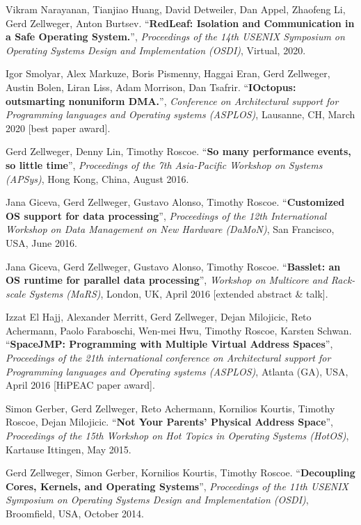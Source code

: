 \documentclass[margin,line]{cv/cv}
\begin{document}
\begin{resume}
    Vikram Narayanan, Tianjiao Huang, David Detweiler, Dan Appel, Zhaofeng Li, Gerd Zellweger, Anton Burtsev.
    ``\textbf{RedLeaf: Isolation and Communication in a Safe Operating System.}'', \textsl{Proceedings of the 14th USENIX Symposium on Operating Systems Design and Implementation (OSDI)}, Virtual, 2020.

    Igor Smolyar, Alex Markuze, Boris Pismenny, Haggai Eran, Gerd Zellweger, Austin Bolen, Liran Liss, Adam Morrison, Dan Tsafrir.
    ``\textbf{IOctopus: outsmarting nonuniform DMA.}'', \textsl{Conference on Architectural support for Programming languages and Operating systems (ASPLOS)}, Lausanne, CH, March 2020 [best paper award].

    Gerd Zellweger, Denny Lin, Timothy Roscoe.
    ``\textbf{So many performance events, so little time}'', \textsl{Proceedings of the 7th Asia-Pacific Workshop on Systems (APSys)}, Hong Kong, China, August 2016.

    Jana Giceva, Gerd Zellweger, Gustavo Alonso, Timothy Roscoe.
    ``\textbf{Customized OS support for data processing}'',
    \textsl{Proceedings of the 12th International Workshop on Data Management on New Hardware (DaMoN)}, San Francisco, USA, June 2016.

    Jana Giceva, Gerd Zellweger, Gustavo Alonso, Timothy Roscoe.
    ``\textbf{Basslet: an OS runtime for parallel data processing}'',
    \textsl{Workshop on Multicore and Rack-scale Systems (MaRS)}, London, UK, April 2016 [extended abstract \& talk].

    Izzat El Hajj, Alexander Merritt, Gerd Zellweger, Dejan Milojicic, Reto Achermann, Paolo Faraboschi, Wen-mei Hwu, Timothy Roscoe, Karsten Schwan.
    ``\textbf{SpaceJMP: Programming with Multiple Virtual Address Spaces}'',  \textsl{Proceedings of the 21th international conference on Architectural support for Programming languages and Operating systems (ASPLOS)}, Atlanta (GA), USA, April 2016 [HiPEAC paper award].

    Simon Gerber, Gerd Zellweger, Reto Achermann, Kornilios Kourtis, Timothy Roscoe, Dejan Milojicic.
    ``\textbf{Not Your Parents' Physical Address Space}'', \textsl{Proceedings of the 15th Workshop on Hot Topics in Operating Systems (HotOS)}, Kartause Ittingen, May 2015.

    Gerd Zellweger, Simon Gerber, Kornilios Kourtis, Timothy Roscoe.
    ``\textbf{Decoupling Cores, Kernels, and Operating Systems}'',
    \textsl{Proceedings of the 11th USENIX Symposium on Operating Systems Design and Implementation (OSDI)}, Broomfield, USA, October 2014.


\end{resume}
\end{document}
